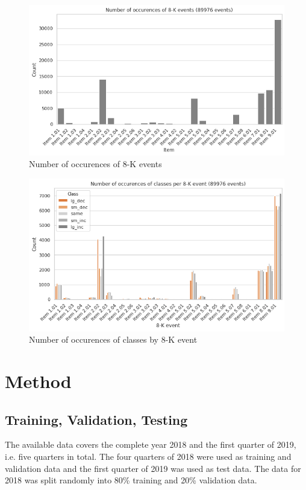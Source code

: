 \documentclass{article}
\begin{document}
	\begin{figure}[h!]
		\includegraphics[width=\linewidth]{img/dist_8k_events.png}
		\caption{Number of occurences of 8-K events}
		\label{fig:dist_8k_events}
	\end{figure}


	\begin{figure}[h!]
		\includegraphics[width=\linewidth]{img/dist_class_by_8k.png}
		\caption{Number of occurences of classes by 8-K event}
		\label{fig:dist_class_by_8k}
	\end{figure}


	\section{Method}
	
	\subsection{Training, Validation, Testing}
	
	The available data covers the complete year 2018 and the first quarter of 2019, i.e. five quarters in total. The four quarters of 2018 were used as training and validation data and the first quarter of 2019 was used as test data. The data for 2018 was split randomly into 80\% training and 20\% validation data. 
	
\end{document}
